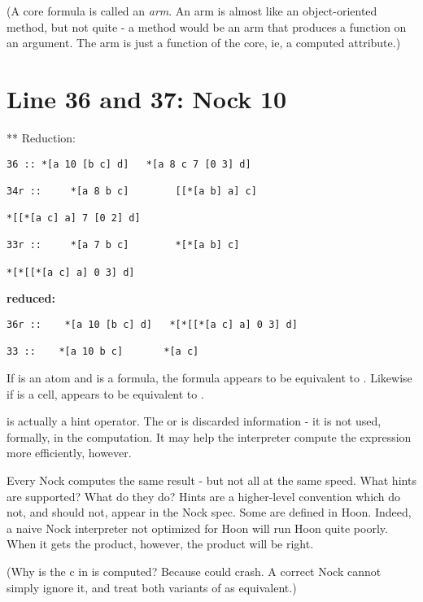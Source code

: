 (A core formula is called an \emph{arm}.  An arm is almost like an object-oriented
method, but not quite - a method would be an arm that produces a function on an
argument.  The arm is just a function of the core, ie, a computed attribute.)

\section{Line 36 and 37: Nock 10}

** Reduction:

\begin{framed_shaded}
\begin{Verbatim}[fontsize=\relsize{-2.5},commandchars=\\\{\}]
 36 :: *[a 10 [b c] d]   *[a 8 c 7 [0 3] d]

34r ::     *[a 8 b c]        [[*[a b] a] c]

*[[*[a c] a] 7 [0 2] d]

33r ::     *[a 7 b c]        *[*[a b] c]

*[*[[*[a c] a] 0 3] d]
\end{Verbatim}
\end{framed_shaded}
\textbf{ reduced:}

\begin{framed_shaded}
\begin{Verbatim}[fontsize=\relsize{-2.5},commandchars=\\\{\}]
36r ::    *[a 10 [b c] d]   *[*[[*[a c] a] 0 3] d]

33 ::    *[a 10 b c]       *[a c]
\end{Verbatim}
\end{framed_shaded}
If  is an atom and  is a formula, the formula \kode{[10 b c]} appears to be
equivalent to . Likewise if \kode{[b c]} is a cell, \kode{[10 [b c] d]} appears to be
equivalent to .

 is actually a hint operator.  The  or \kode{[b c]}is discarded information -
it is not used, formally, in the computation.  It may help the interpreter
compute the expression more efficiently, however.

Every Nock computes the same result - but not all at the same speed.  What
hints are supported?  What do they do?  Hints are a higher-level convention
which do not, and should not, appear in the Nock spec.  Some are defined in
Hoon.  Indeed, a naive Nock interpreter not optimized for Hoon will run Hoon
quite poorly.  When it gets the product, however, the product will be right.

(Why is the c in \kode{[b c]} is computed?  Because  could crash.  A correct
Nock cannot simply ignore it, and treat both variants of  as equivalent.)